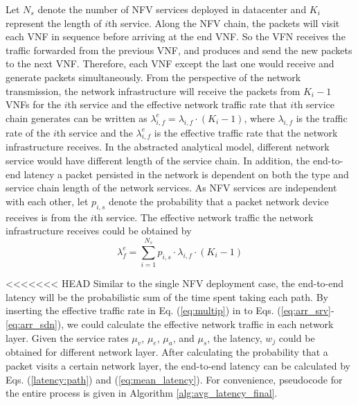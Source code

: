 Let $N_s$ denote the number of NFV services deployed in datacenter and $K_i$ represent the length of $i$th service. Along the NFV chain, the packets will visit each VNF in sequence before arriving at the end VNF. So the VFN receives the traffic forwarded from the previous VNF, and produces and send the new packets to the next VNF. Therefore, each VNF except the last one would receive and generate packets simultaneously. From the perspective of the network transmission, the network infrastructure will receive the packets from $K_i-1$ VNFs for the $i$th service and the effective network traffic rate that $i$th service chain generates can be written as $\lambda_{i,f}^{e} = \lambda_{i,f} \cdot (K_i - 1)$, where $\lambda_{i,f}$ is the traffic rate of the $i$th service and the $\lambda_{i,f}^e$ is the effective traffic rate that the network infrastructure receives. In the abstracted analytical model, different network service would have different length of the service chain. In addition, the end-to-end latency a packet persisted in the network is dependent on both the type and service chain length of the network services. As NFV services are independent with each other, let $p_{i,s}$ denote the probability that a packet network device receives is from the $i$th service.
The effective network traffic the network infrastructure receives could be obtained by 
\begin{equation}
\label{eq:multip}
\lambda _{ f }^{ e }=\sum _{ i=1 }^{ { N }_{ s } }{p_{i,s} \cdot \lambda _{ i,f }\cdot (K_{ i }-1) }
\end{equation}

<<<<<<< HEAD
Similar to the single NFV deployment case, the end-to-end latency will be the probabilistic sum of the time spent taking each path. By inserting the effective traffic rate in Eq. (\ref{eq:multip}) in to Eqs. (\ref{eq:arr_srv}-\ref{eq:arr_sdn}), we could calculate the effective network traffic in each network layer. Given the service rates $\mu_v$, $\mu_e$, $\mu_a$, and $\mu_s$, the latency, $w_j$ could be obtained for different network layer. After calculating the probability that a packet visits a certain network layer, the end-to-end latency can be calculated by Eqs. (\ref{latency:path}) and (\ref{eq:mean_latency}). 
For convenience, pseudocode for the entire process is given in Algorithm \ref{alg:avg_latency_final}.

